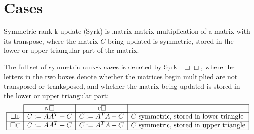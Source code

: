 \chapter{Cases}
Symmetric rank-k update ({\sc Syrk}) 
is matrix-matrix multiplication of a matrix with its transpose, where the matrix $ C $ being updated is symmetric, stored in the lower or upper triangular part of the matrix.  

The full set of 
symmetric rank-k cases 
is denoted by {\sc Syrk\_$\Box \Box $}, 
where the letters in the two boxes denote whether the 
matrices begin multiplied are {\sc n}ot transposed or {\sc t}ranksposed, 
and whether the matrix being updated is stored in the 
{\sc l}ower or {\sc u}pper triangular part:
\[
\begin{array}{c |  c   |   c  | l |} \cline{2-4}
&  {\mbox{\sc n} \Box  }
&  {\mbox{\sc t} \Box  } 
&
\\ \cline{2-3}
\hline
\multicolumn{1}{|c |}{ \Box \mbox{\sc l}} & C := A A^T + C &
C := A^T A + C 
& \mbox{$ C $ symmetric, stored in lower triangle}\\
\hline
\multicolumn{1}{|c |}{ \Box \mbox{\sc u}} & C := A A^T + C &
C := A^T A + C 
& \mbox{$ C $ symmetric, stored in upper triangle}\\
\hline
\end{array}
\]
